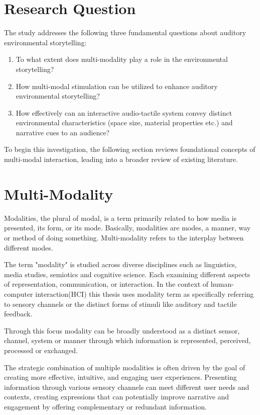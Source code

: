     \section{Research Question} 
    The study addresses the following three fundamental questions about auditory environmental storytelling:
    \begin{enumerate}
        \item To what extent does multi-modality play a role in the environmental storytelling?
        \item How multi-modal stimulation can be utilized to enhance auditory environmental storytelling?
        \item How effectively can an interactive audio-tactile system convey distinct environmental characteristics (space size, material properties etc.) and narrative cues to an audience?
    \end{enumerate}
    To begin this investigation, the following section reviews foundational concepts of multi-modal interaction, leading into a broader review of existing literature.
    \section{Multi-Modality} 
    Modalities, the plural of modal, is a term primarily related to how media is presented, its form, or its mode. Basically, modalities are modes, a manner, way or method of doing something. Multi-modality refers to the interplay between different modes\cite{Multimodal_Discourse}.\par 

    The term "modality" is studied across diverse disciplines such as linguistics, media studies, semiotics and cognitive science. Each examining different aspects of representation, communication, or interaction. In the context of human-computer interaction(HCI) this thesis uses modality term as specifically referring to sensory channels or the distinct forms of stimuli like auditory and tactile feedback.\par

    Through this focus modality can be broadly understood as a distinct sensor, channel, system or manner through which information is represented, perceived, processed or exchanged.\par

    The strategic combination of multiple modalities is often driven by the goal of creating more effective, intuitive, and engaging user experiences. Presenting information through various sensory channels can meet different user needs and contexts, creating expressions that can potentially improve narrative and engagement by offering complementary or redundant information.\par


